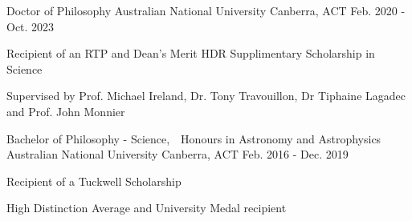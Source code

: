 

\begin{cventries}

  \cventry
    {Doctor of Philosophy} %
    {Australian National University} %
    {Canberra, ACT} %
    {Feb. 2020 - Oct. 2023} %
    {
      \begin{cvitems} %
        \item {Recipient of an RTP and Dean's Merit HDR Supplimentary Scholarship in Science}
        \item {Supervised by Prof. Michael Ireland, Dr. Tony Travouillon, Dr Tiphaine Lagadec and Prof. John Monnier}
      \end{cvitems}
    }
  \cventry
    {Bachelor of Philosophy - Science,\ \ Honours in Astronomy and Astrophysics} %
    {Australian National University} %
    {Canberra, ACT} %
    {Feb. 2016 - Dec. 2019} %
    {
      \begin{cvitems} %
        \item {Recipient of a Tuckwell Scholarship}
        \item {High Distinction Average and University Medal recipient}
      \end{cvitems}
    }


\end{cventries}
